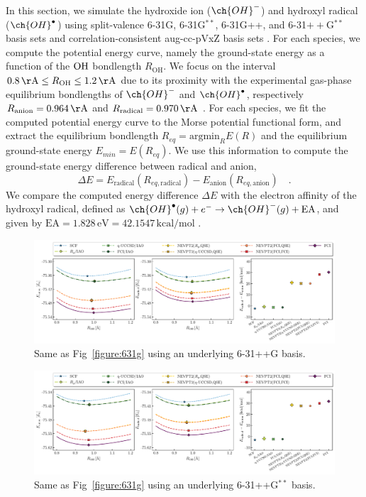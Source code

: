 \documentclass[aps,pra,twocolumn]{revtex4-2}
\newcommand{\OHradical}{\ch{OH}^\bullet}
\newcommand{\OHanion}{\ch{OH}^-}
\begin{document}
In this section, we simulate the hydroxide ion ($\OHanion$) and hydroxyl radical ($\OHradical$) using split-valence 6-31G, 6-31G${}^{**}$, 6-31G++, and 6-31$++$G${}^{**}$ basis sets
\cite{hehre1972self} and correlation-consistent aug-cc-pVxZ basis sets \cite{dunning1989gaussian}.
For each species, we compute the potential energy curve, namely the ground-state energy as a function of the $\ce{OH}$ bondlength $R_{\mathrm{OH}}$.
We focus on the interval $0.8 \, \mathrm{\AA} \leq R_{\mathrm{OH}} \leq 1.2 \, \mathrm{\AA}$ due to its proximity with the experimental gas-phase equilibrium bondlengths of $\OHanion$ and $\OHradical$,
respectively $R_{\mathrm{anion}} = 0.964 \, \mathrm{\AA}$ and $R_{\mathrm{radical}} = 0.970 \, \mathrm{\AA}$ \cite{johnson1999nist}.
For each species, we fit the computed potential energy curve to the Morse potential functional form, 
and extract the equilibrium bondlength $R_{eq} = \mathrm{argmin}_R E(R)$ and the equilibrium ground-state energy $E_{min} = E(R_{eq})$.
We use this information to compute the ground-state energy difference between radical and anion, 
\begin{equation}
\Delta E = E_{\mathrm{radical}}(R_{eq,\mathrm{radical}}) - E_{\mathrm{anion}}(R_{eq,\mathrm{anion}})
\quad.
\end{equation}
We compare the computed energy difference $\Delta E$ with the electron affinity of the hydroxyl radical, defined as $\OHradical(g) + e^- \to \OHanion(g) + \mathrm{EA}$,
and given by $\mathrm{EA} = 1.828 \, \mathrm{eV} = 42.1547 \, \mathrm{kcal/mol}$ \cite{johnson1999nist}.


\begin{figure}[t!]
\includegraphics[width=\textwidth]{../nevpt2/6-31ppg/fig.pdf}
\caption{Same as Fig~\ref{figure:631g} using an underlying 6-31++G basis.}
\label{figure:631ppg}
\end{figure}

\begin{figure}[t!]
\includegraphics[width=\textwidth]{../nevpt2/6-31ppgss/fig.pdf}
\caption{Same as Fig~\ref{figure:631g} using an underlying 6-31++G${}^{**}$ basis.}
\label{figure:631ppgss}
\end{figure}
\end{document}
